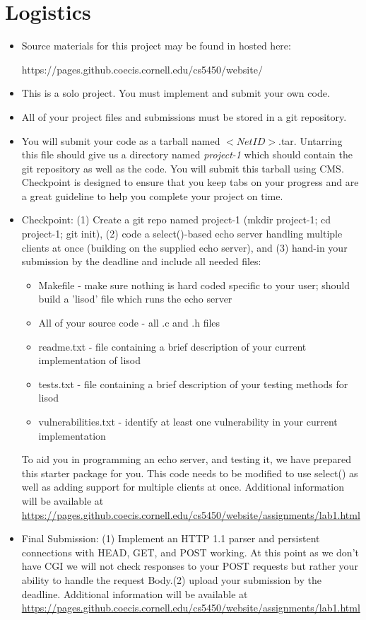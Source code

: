 \documentclass[12pt]{article}
\begin{document}
\section{Logistics}
\begin{itemize}
\item  Source materials for this project may be found in hosted here:

https://pages.github.coecis.cornell.edu/cs5450/website/

\item  This is a solo project. You must implement and submit your own code.
\item  All of your project files and submissions must be stored in a git repository.
\item You will submit your code as a tarball named $<NetID>$.tar. Untarring this file should give us a directory named \textit{project-1} which should contain the git repository as well as the code. You will submit this tarball using CMS.
Checkpoint is designed to ensure that you keep tabs on your progress and are a great guideline to help you complete your project on time.

\item Checkpoint: (1) Create a git repo named project-1 (mkdir project-1; cd project-1; git init), (2) code a select()-based echo server handling multiple clients at once (building on the supplied echo server), and (3) hand-in your submission by the deadline and include all needed files:
\begin{itemize}
\item Makefile - make sure nothing is hard coded specific to your user; should build a 'lisod' file which runs the echo server
\item All of your source code - all .c and .h files
\item readme.txt - file containing a brief description of your current implementation of lisod
\item tests.txt - file containing a brief description of your testing methods for lisod
\item vulnerabilities.txt - identify at least one vulnerability in your current implementation

\end{itemize}
To aid you in programming an echo server, and testing it, we have prepared this starter package  for you. This code needs to be modified to use select() as well as adding support for multiple clients at once. Additional information will be available at \url{https://pages.github.coecis.cornell.edu/cs5450/website/assignments/lab1.html}
\item Final Submission: (1) Implement an HTTP 1.1 parser and persistent connections with HEAD, GET, and POST working. At this point as we don’t have CGI we will not check responses to your POST requests but rather your ability to handle the request Body.(2) upload your submission by the deadline. Additional information will be available at \url{https://pages.github.coecis.cornell.edu/cs5450/website/assignments/lab1.html}
\end{itemize}
\end{document}
